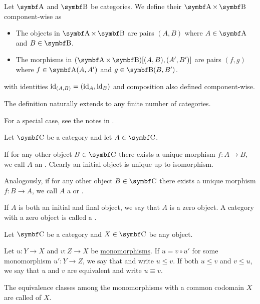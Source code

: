 \begin{definition}\label{def:product_category}
  Let \( \Cat{A} \) and \( \Bold B \) be categories. We define their  \( \Cat{A} \times \Bold B \) component-wise as
  \begin{itemize}
    \item The objects in \( \Cat{A} \times \Bold B \) are pairs \( (A, B) \) where \( A \in \Cat{A} \) and \( B \in \Bold B \).
    \item The morphisms in \( (\Cat{A} \times \Bold B)[(A, B), (A', B')] \) are pairs \( (f, g) \) where \( f \in \Cat{A}(A, A') \) and \( g \in \Bold{B}(B, B') \).
  \end{itemize}
  with identities \( \operatorname{id}_{(A,B)} =(\operatorname{id}_A, \operatorname{id}_B) \) and composition also defined component-wise.

  The definition naturally extends to any finite number of categories.

  For a special case, see the notes in .
\end{definition}

\begin{definition}\label{def:zero_objects}
  Let \( \Cat{C} \) be a category and let \( A \in \Cat{C} \).

  \begin{DefEnum}
     If for any other object \( B \in \Cat{C} \) there exists a unique morphism \( f: A \to B \), we call \( A \) an . Clearly an initial object is unique up to isomorphism.

     Analogously, if for any other object \( B \in \Cat{C} \) there exists a unique morphism \( f: B \to A \), we call \( A \) a  or .

     If \( A \) is both an initial and final object, we say that \( A \) is a zero object. A category with a zero object is called a .
  \end{DefEnum}
\end{definition}

\begin{definition}\label{def:categorical_subobject}
  Let \( \Cat{C} \) be a category and \( X \in \Cat{C} \) be any object.

  Let \( u: Y \to X \) and \( v: Z \to X \) be \hyperref[def:morphism_invertibility]{monomorphisms}. If \( u = v \circ u' \) for some monomorphism \( u': Y \to Z \), we say that  and write \( u \leq v \). If both \( u \leq v \) and \( v \leq u \), we say that \( u \) and \( v \) are equivalent and write \( u \equiv v \).

  The equivalence classes among the monomorphisms with a common codomain \( X \) are called  of \( X \).
\end{definition}

